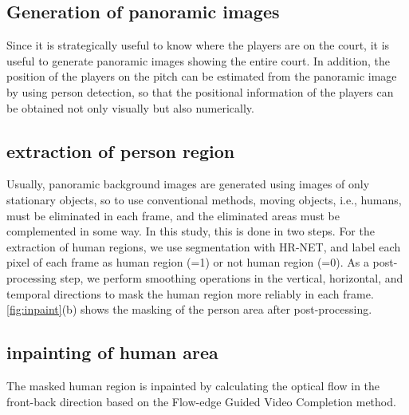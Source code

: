\subsection{Generation of panoramic images}
Since it is strategically useful to know where the players are on the court, it is useful to generate panoramic images showing the entire court. In addition, the position of the players on the pitch can be estimated from the panoramic image by using person detection, so that the positional information of the players can be obtained not only visually but also numerically.

\subsection{extraction of person region}

Usually, panoramic background images are generated using images of only stationary objects, so to use conventional methods, moving objects, i.e., humans, must be eliminated in each frame, and the eliminated areas must be complemented in some way. In this study, this is done in two steps.
For the extraction of human regions, we use segmentation with HR-NET\cite{SunXLW19}, and label each pixel of each frame as human region (=1) or not human region (=0). As a post-processing step, we perform smoothing operations in the vertical, horizontal, and temporal directions to mask the human region more reliably in each frame. \ref{fig:inpaint}(b) shows the masking of the person area after post-processing.

\subsection{inpainting of human area}
The masked human region is inpainted by calculating the optical flow in the front-back direction based on the Flow-edge Guided Video Completion\cite{Gao2020} method. 


